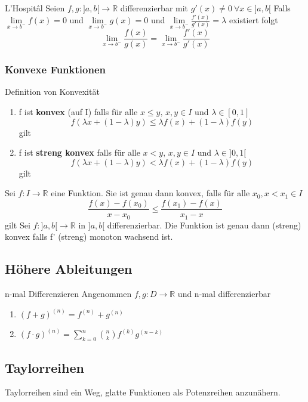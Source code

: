 \documentclass[a4paper,10pt]{article}
\def\R{\mathbb{R}}
\begin{document}
\begin{mainbox}{L'Hospitâl}
  Seien $f,g: ]a,b[ \to \R$ differenzierbar mit $g'(x) \neq 0 \> \forall x\in]a,b[$
  Falls $\lim\limits_{x\to b^-} f(x) = 0$ und $\lim\limits_{x\to b^-} g(x) = 0$ und $\lim\limits_{x\to b^-} \frac{f'(x)}{g'(x)} = \lambda$ existiert folgt \[\lim\limits_{x\to b^-} \frac{f(x)}{g(x)} = \lim\limits_{x\to b^-} \frac{f'(x)}{g'(x)}\]
\end{mainbox}

\subsubsection{Konvexe Funktionen}
\begin{mainbox}{Definition von Konvexität}
  \begin{enumerate}[leftmargin=*]
    \item f ist \textbf{konvex} (auf I) falls für alle $x \leq y,\, x,y\in I$ und $\lambda \in [0,1]$ \[f(\lambda x + (1-\lambda)y) \leq \lambda f(x) + (1-\lambda)f(y)\] gilt
    \item f ist \textbf{streng konvex} falls für alle $x < y, \, x,y \in I$ und $\lambda\in]0,1[$ \[ f(\lambda x + (1-\lambda)y) < \lambda f(x) + (1-\lambda)f(y) \] gilt
  \end{enumerate}
\end{mainbox}
Sei $f: I \to \R$ eine Funktion. Sie ist genau dann konvex, falls für alle $x_0, x < x_1 \in I$ \[\frac{f(x)-f(x_0)}{x-x_0}\leq \frac{f(x_1)-f(x)}{x_1-x}\] gilt
Sei $f:]a,b[ \to \R$ in $]a,b[$ differenzierbar. Die Funktion ist genau dann (streng) konvex falls f' (streng) monoton wachsend ist.

\subsection{Höhere Ableitungen}
\begin{mainbox}{n-mal Differenzieren}
  Angenommen $f,g: D\to \R$ und n-mal differenzierbar
  \begin{enumerate}[leftmargin=*]
    \item $(f+g)^{(n)} = f^{(n)} + g^{(n)}$
    \item $(f\cdot g)^{(n)} = \sum\limits_{k=0}^{n}\binom{n}{k}f^{(k)}g^{(n-k)}$ 
  \end{enumerate}
\end{mainbox}

\subsection{Taylorreihen}
Taylorreihen sind ein Weg, glatte Funktionen als Potenzreihen anzunähern.
\end{document}
